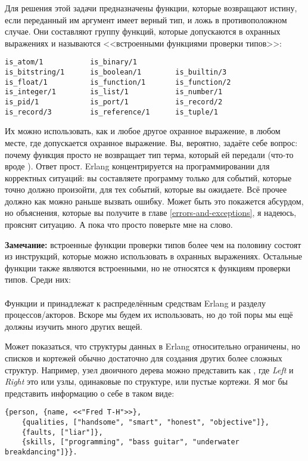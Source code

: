 Для решения этой задачи предназначены функции, которые возвращают истину, если переданный им аргумент имеет верный тип, и ложь в противоположном случае.
Они составляют группу функций, которые допускаются в охранных выражениях и называются <<встроенными функциями проверки типов>>:
\begin{lstlisting}[style=erlang]
is_atom/1           is_binary/1        
is_bitstring/1      is_boolean/1        is_builtin/3       
is_float/1          is_function/1       is_function/2      
is_integer/1        is_list/1           is_number/1        
is_pid/1            is_port/1           is_record/2        
is_record/3         is_reference/1      is_tuple/1        
\end{lstlisting}

Их можно использовать, как и любое другое охранное выражение, в любом месте, где допускается охранное выражение.
Вы, вероятно, задаёте себе вопрос: почему функция просто не возвращает тип терма, который ей передали (что\--то вроде ).
Ответ прост.
Erlang концентрируется на программировании для корректных ситуаций: вы составляете программу только для событий, которые точно должно произойти, для тех событий, которые вы ожидаете.
Всё прочее должно как можно раньше вызвать ошибку.
Может быть это покажется абсурдом, но объяснения, которые вы получите в главе \ref{errors-and-exceptions}, я надеюсь, прояснят ситуацию.
А пока что просто поверьте мне на слово.\\
\colorbox{lgray}
{
    \begin{minipage}{\linewidth}
\textbf{Замечание:} встроенные функции проверки типов более чем на половину состоят из инструкций, которые можно использовать в охранных выражениях.
Остальные функции также являются встроенными, но не относятся к функциям проверки типов.
Среди них:\\
\\
Функции  и  принадлежат к распределённым средствам Erlang и разделу процессов/акторов.
Вскоре мы будем их использовать, но до той поры мы ещё должны изучить много других вещей.
    \end{minipage}
}

Может показаться, что структуры данных в Erlang относительно ограничены, но списков и кортежей обычно достаточно для создания других более сложных структур.
Например, узел двоичного дерева можно представить как , где \emph{Left} и \emph{Right} это или узлы, одинаковые по структуре, или пустые кортежи.
Я мог бы представить информацию о себе в таком виде:
\begin{lstlisting}[style=erlang]
{person, {name, <<"Fred T-H">>},
    {qualities, ["handsome", "smart", "honest", "objective"]},
    {faults, ["liar"]},
    {skills, ["programming", "bass guitar", "underwater breakdancing"]}}.
\end{lstlisting}

